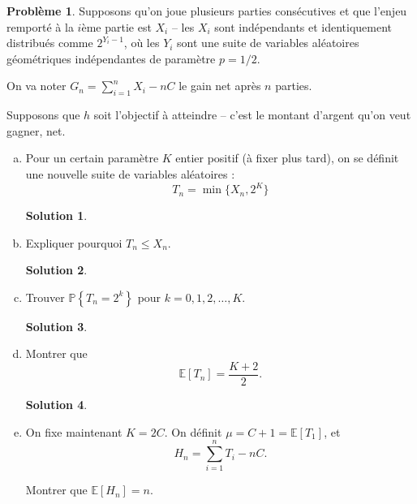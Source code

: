 \documentclass[11pt]{amsart}
\theoremstyle{definition}
\newtheorem{probleme}{Problème}
\newtheorem*{solution}{Solution}
\theoremstyle{remark}
\numberwithin{equation}{section}
\newcommand{\PR} {\mathbb P}
\newcommand{\ES} {\mathbb E}
\newcommand{\ac}[1]{\left\{ #1 \right\}} %
\newcommand{\ct}[1]{\left[ #1 \right]} %
\newcommand \1 {\mathbbm 1}
\begin{document}
	\begin{probleme}
		Supposons qu'on joue plusieurs parties consécutives et que l'enjeu remporté à la $i$ème partie est $X_i$ -- les $X_i$ sont indépendants et identiquement distribués comme $2^{Y_i-1}$, où les $Y_i$ sont une suite de variables aléatoires géométriques indépendantes de paramètre $p=1/2$.
		
		On va noter $G_n = \sum_{i=1}^n X_i - n C$ le gain net après $n$ parties.
		
		Supposons que $h$ soit l'objectif à atteindre -- c'est le montant d'argent qu'on
		veut gagner, net.
		
		\begin{enumerate}[(a)]
			\item Pour un certain paramètre $K$ entier positif (à fixer plus tard), on se définit une nouvelle suite de variables aléatoires : $$T_n = \min\{X_n, 2^K\}$$
		
		\begin{solution}
		\end{solution}
		\vspace{0.3cm}
		
			
			\item Expliquer pourquoi $T_n \leq X_n$.
		
		\begin{solution}
		\end{solution}
		\vspace{0.3cm}
		
			
			\item Trouver $\PR \ac{T_n = 2^k}$ pour $k = 0, 1, 2, \dots,K$.
		
		\begin{solution}
		\end{solution}
		\vspace{0.3cm}
		
			
			\item Montrer que $$\ES \ct{T_n} = \frac{K+2}{2}.$$
		
		\begin{solution}
		\end{solution}
		\vspace{0.3cm}
		
			
			\item On fixe maintenant $K = 2 C$. On définit $\mu = C + 1 = \ES \ct{T_1}$, et
			$$H_n = \sum_{i=1}^n T_i - n C.$$
		
			Montrer que $\ES \ct{H_n} = n$.
		

\end{enumerate}
\end{probleme}
\end{document}
